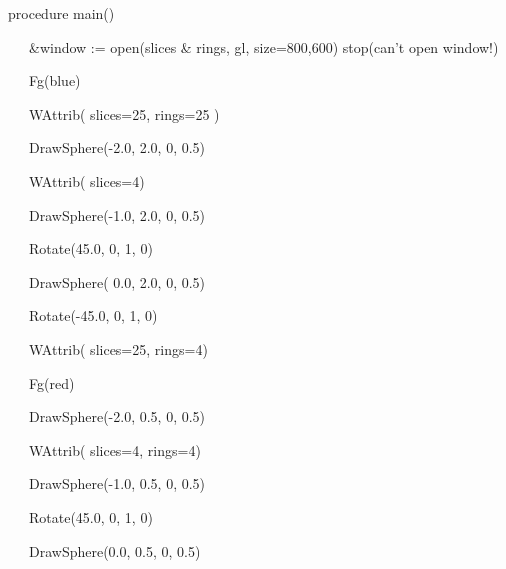 \documentclass[letterpaper]{article}
\begin{document}
{\sffamily
procedure main()}

{\sffamily
\ \ \ \&window := open({\textquotedbl}slices \& rings{\textquotedbl}, {\textquotedbl}gl{\textquotedbl},
{\textquotedbl}size=800,600{\textquotedbl}) {\textbar} stop({\textquotedbl}can't open window!{\textquotedbl})}


\bigskip

{\sffamily
\ \ \ Fg({\textquotedbl}blue{\textquotedbl}) \ }

{\sffamily
\ \ \ WAttrib( {\textquotedbl}slices=25{\textquotedbl}, {\textquotedbl}rings=25{\textquotedbl} ) \ \ }

{\sffamily
\ \ \ DrawSphere(-2.0, 2.0, 0, 0.5)}


\bigskip

{\sffamily
\ \ \ WAttrib( {\textquotedbl}slices=4{\textquotedbl}) \ \ }

{\sffamily
\ \ \ DrawSphere(-1.0, 2.0, 0, 0.5)}


\bigskip

{\sffamily
\ \ \ Rotate(45.0, 0, 1, 0)}

{\sffamily
\ \ \ DrawSphere( 0.0, 2.0, 0, 0.5)}

{\sffamily
\ \ \ Rotate(-45.0, 0, 1, 0)}


\bigskip

{\sffamily
\ \ \ WAttrib( {\textquotedbl}slices=25{\textquotedbl}, {\textquotedbl}rings=4{\textquotedbl}) \ \ }

{\sffamily
\ \ \ Fg({\textquotedbl}red{\textquotedbl}) \ }

{\sffamily
\ \ \ DrawSphere(-2.0, 0.5, 0, 0.5)}


\bigskip

{\sffamily
\ \ \ WAttrib( {\textquotedbl}slices=4{\textquotedbl}, {\textquotedbl}rings=4{\textquotedbl}) \ \ }

{\sffamily
\ \ \ DrawSphere(-1.0, 0.5, 0, 0.5)}


\bigskip

{\sffamily
\ \ \ Rotate(45.0, 0, 1, 0)}

{\sffamily
\ \ \ DrawSphere(0.0, 0.5, 0, 0.5)}
\end{document}
